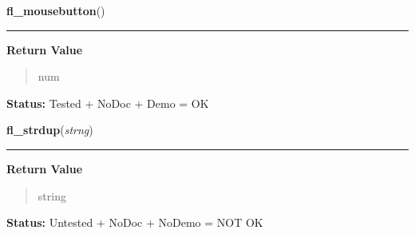     \label{xformslib:library:fl_mouse_button}

    \vspace{0.5ex}

\hspace{.8\funcindent}\begin{boxedminipage}{\funcwidth}

    \raggedright \textbf{fl\_mousebutton}()

    \vspace{-1.5ex}

    \rule{\textwidth}{0.5\fboxrule}
\setlength{\parskip}{2ex}
\setlength{\parskip}{1ex}
      \textbf{Return Value}
    \vspace{-1ex}

      \begin{quote}
      num

      \end{quote}

\textbf{Status:} Tested + NoDoc + Demo = OK



    \end{boxedminipage}

    \label{xformslib:library:fl_strdup}

    \vspace{0.5ex}

\hspace{.8\funcindent}\begin{boxedminipage}{\funcwidth}

    \raggedright \textbf{fl\_strdup}(\textit{strng})

    \vspace{-1.5ex}

    \rule{\textwidth}{0.5\fboxrule}
\setlength{\parskip}{2ex}
\setlength{\parskip}{1ex}
      \textbf{Return Value}
    \vspace{-1ex}

      \begin{quote}
      string

      \end{quote}

\textbf{Status:} Untested + NoDoc + NoDemo = NOT OK



    \end{boxedminipage}

